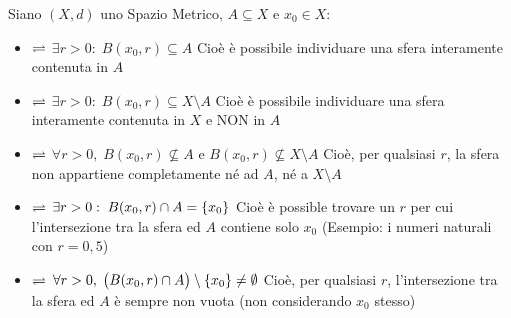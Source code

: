 \begin{definition}
	\label{def:pti_e_spa_metr}
	Siano $(X,d)$ uno Spazio Metrico, $A \subseteq X$ e $x_0 \in X$:
	\begin{itemize}
		\item {} $\rightleftharpoons$ \quad $\exists r > 0:\; B(x_0, r) \subseteq A$\newline
			{\footnotesize Cioè è possibile individuare una sfera interamente contenuta in $A$}
		\item {} $\rightleftharpoons$ \quad $\exists r > 0:\; B(x_0, r) \subseteq X \setminus A$\newline
			{\footnotesize Cioè è possibile individuare una sfera interamente contenuta in $X$ e NON in $A$}
		\item {} $\rightleftharpoons$ \quad $\forall r > 0,\; B(x_0, r) \nsubseteq A \text{ e } B(x_0, r) \nsubseteq X \setminus A$\newline
			{\footnotesize Cioè, per qualsiasi $r$, la sfera non appartiene completamente né ad $A$, né a $X \setminus A$}
		\item {} $\rightleftharpoons$ \quad $\exists r > 0:\; B(x_0, r) \cap A = \left\{x_0\right\}$\newline
			{\footnotesize Cioè è possible trovare un $r$ per cui l'intersezione tra la sfera ed $A$ contiene solo $x_0$ (Esempio: i numeri naturali con $r = 0,5$)}
		\item {} $\rightleftharpoons$ \quad $\forall r > 0,\; \bigl( B(x_0, r) \cap A \bigr) \setminus \left\{x_0\right\} \neq \emptyset$\newline
			{\footnotesize Cioè, per qualsiasi $r$, l'intersezione tra la sfera ed $A$ è sempre non vuota (non considerando $x_0$ stesso)}
	\end{itemize}
\end{definition}
\newpage %
